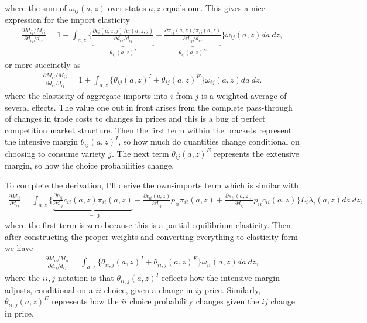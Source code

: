 \documentclass[12pt,pdftex]{article}
\begin{document}
\begin{onehalfspacing}
\begin{align}
\end{align}
where the sum of $\omega_{ij}(a,z)$ over states $a,z$ equals one. This gives a nice expression for the import elasticity
\begin{align}
\frac{\partial  M_{ij} / M_{ij}}{\partial d_{ij} / d_{ij}} = 1 + \int_{a,z} \bigg \{ \underbrace{ \frac{\partial c_{i}(a,z,j)/ c_{i}(a,z,j)}{\partial d_{ij} / d_{ij}} }_{\theta_{ij}(a,z)^{I}}+
\underbrace{\frac{\partial \pi_{ij}(a,z) / \pi_{ij}(a,z)}{\partial d_{ij} / d_{ij}} }_{\theta_{ij}(a,z)^{E}} \bigg \} \omega_{ij}(a,z)da \ dz,
\end{align}
or more succinctly as
\begin{align}
\frac{\partial  M_{ij} / M_{ij}}{\partial d_{ij} / d_{ij}} = 1 + \int_{a,z} \bigg \{ \theta_{ij}(a,z)^{I} + \theta_{ij}(a,z)^{E} \bigg \}\omega_{ij}(a,z)da \ dz.
\end{align}
where the elasticity of aggregate imports into $i$ from $j$ is a weighted average of several effects. The value one out in front arises from the complete pass-through of changes in trade costs to changes in prices and this is a bug of perfect competition market structure. Then the first term within the brackets represent the intensive margin $\theta_{ij}(a,z)^{I}$, so how much do quantities change conditional on choosing to consume variety $j$. The next term $\theta_{ij}(a,z)^{E}$ represents the extensive margin, so how the choice probabilities change.

To complete the derivation, I'll derive the own-imports term which is similar with
\begin{align}
\frac{\partial  M_{ii}}{\partial d_{ij}} = \int_{a,z} \bigg \{ \underbrace{\frac{\partial p_{ii}}{\partial d_{ij}} c_{ii}(a,z) \pi_{ii}(a,z)}_{ \ = \ 0} +  \frac{\partial c_{ii}(a,z)}{\partial d_{ij}} p_{ii} \pi_{ii}(a,z) + \frac{\partial \pi_{ii}(a,z)}{\partial d_{ij}} p_{ii}c_{ii}(a,z) \bigg \} L_i \lambda_{i}(a,z)da \ dz,
\end{align}
where the first-term is zero because this is a partial equilibrium elasticity. Then after constructing the proper weights and converting everything to elasticity form we have
\begin{align}
\frac{\partial  M_{ii} / M_{ii}}{\partial d_{ij} / d_{ij}} = \int_{a,z} \bigg \{ \theta_{ii,j}(a,z)^{I} + \theta_{ii,j}(a,z)^{E} \bigg \}\omega_{ii}(a,z)da \ dz,
\end{align}
where the $ii, j$ notation is that $\theta_{ii,j}(a,z)^{I}$ reflects how the intensive margin adjusts, conditional on a $ii$ choice, given a change in $ij$ price. Similarly, $\theta_{ii,j}(a,z)^{E}$ represents how the $ii$ choice probability changes given the $ij$ change in price.


\end{onehalfspacing}
\end{document}
